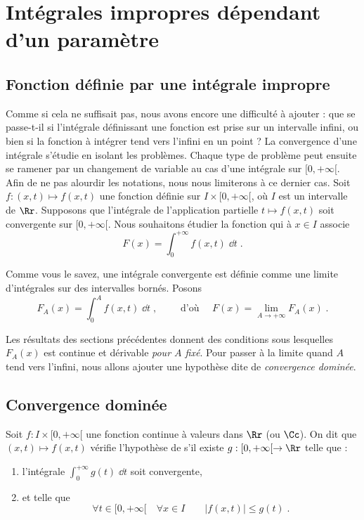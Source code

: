\documentclass[class=report,crop=false]{standalone}
\begin{document}
\section{Intégrales impropres dépendant d'un paramètre}

\subsection{Fonction définie par une intégrale impropre}

Comme si cela ne suffisait pas, nous avons encore une difficulté à
ajouter : que se passe-t-il si l'intégrale définissant une
fonction est prise sur un intervalle infini, ou bien si la fonction
à intégrer tend vers l'infini en un point ? 
La convergence d'une intégrale s'étudie en isolant les problèmes. 
Chaque type de problème peut ensuite se ramener par un changement de variable au cas d'une
intégrale sur $[0,+\infty[$. Afin de ne pas alourdir les notations,
nous nous limiterons à ce dernier cas. Soit $f : (x,t)\longmapsto f(x,t)$ 
une fonction définie sur $I\times [0,+\infty[$, où $I$ est un intervalle de $\Rr$. 
Supposons que l'intégrale de l'application partielle $t\longmapsto f(x,t)$ soit
convergente sur $[0,+\infty[$. Nous souhaitons
étudier la fonction qui à $x\in I$ associe
$$F(x)=\int_0^{+\infty} f(x,t)\;\dd t\;.$$


Comme vous le savez, une intégrale convergente est définie comme
une limite d'intégrales sur des intervalles bornés. Posons
$$F_A(x)= \int_0^A f(x,t)\;\dd t\;,\qquad\text{ d'où }\quad F(x)=\lim_{A\to+\infty} F_A(x)\;.$$

Les résultats des sections précédentes donnent des conditions
sous lesquelles $F_A(x)$ est continue et dérivable \emph{pour $A$ fixé}. Pour passer à la limite quand $A$ tend vers
l'infini, nous allons ajouter une hypothèse dite de \emph{convergence dominée}.

\subsection{Convergence dominée}


\begin{definition}
Soit $f :  I \times [0,+\infty[$ une fonction continue à valeurs dans $\Rr$ (ou $\Cc$).
On dit que $(x,t) \longmapsto f(x,t)$ vérifie l'hypothèse de  
s'il existe $g : [0,+\infty[ \to \Rr$ telle que :
\begin{enumerate}
  \item l'intégrale $\int_0^{+\infty} g(t)\;\dd t$ soit convergente,
  
  \item et telle que 
$$\forall t\in [0,+\infty[\quad\forall x\in I\qquad\big|f(x,t)\big|\le g(t)\;.$$
\end{enumerate}
\end{definition}
\end{document}
